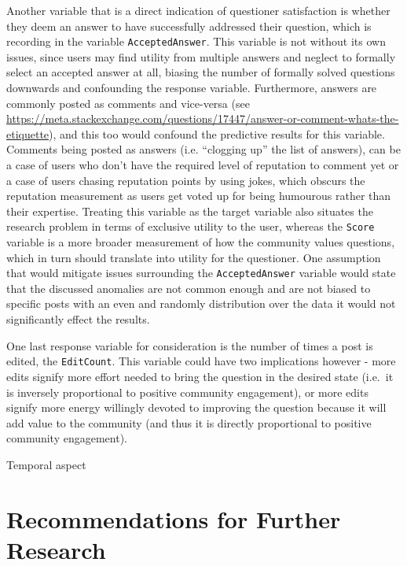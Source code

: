 \documentclass[11pt,preprint, authoryear]{article}
\numberwithin{equation}{section}
\begin{document}
Another variable that is a direct indication of questioner satisfaction
is whether they deem an answer to have successfully addressed their
question, which is recording in the variable \texttt{AcceptedAnswer}.
This variable is not without its own issues, since users may find
utility from multiple answers and neglect to formally select an accepted
answer at all, biasing the number of formally solved questions downwards
and confounding the response variable. Furthermore, answers are commonly
posted as comments and vice-versa (see
\url{https://meta.stackexchange.com/questions/17447/answer-or-comment-whats-the-etiquette}),
and this too would confound the predictive results for this variable.
Comments being posted as answers (i.e. ``clogging up'' the list of
answers), can be a case of users who don't have the required level of
reputation to comment yet or a case of users chasing reputation points
by using jokes, which obscurs the reputation measurement as users get
voted up for being humourous rather than their expertise. Treating this
variable as the target variable also situates the research problem in
terms of exclusive utility to the user, whereas the \texttt{Score}
variable is a more broader measurement of how the community values
questions, which in turn should translate into utility for the
questioner. One assumption that would mitigate issues surrounding the
\texttt{AcceptedAnswer} variable would state that the discussed
anomalies are not common enough and are not biased to specific posts
with an even and randomly distribution over the data it would not
significantly effect the results.

One last response variable for consideration is the number of times a
post is edited, the \texttt{EditCount}. This variable could have two
implications however - more edits signify more effort needed to bring
the question in the desired state (i.e.~it is inversely proportional to
positive community engagement), or more edits signify more energy
willingly devoted to improving the question because it will add value to
the community (and thus it is directly proportional to positive
community engagement).

Temporal aspect

\newpage

\section{\texorpdfstring{Recommendations for Further Research
\label{Recom}}{Recommendations for Further Research }}\label{recommendations-for-further-research}
\end{document}
